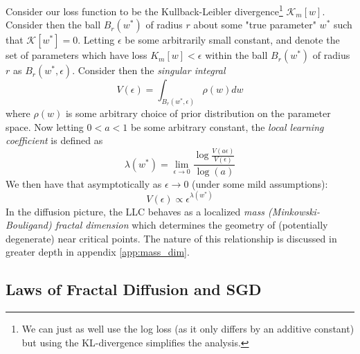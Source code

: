 \documentclass{article} %
\theoremstyle{definition}
\begin{document}
Consider our loss function to be the Kullback-Leibler divergence\footnote{We can just as well use the log loss (as it only differs by an additive constant) but using the KL-divergence simplifies the analysis.} $\mathcal{K}_m[w]$. Consider then the ball $B_r(w^*)$ of radius $r$ about some "true parameter" $w^*$ such that $\mathcal{K}[w^*] = 0$. Letting $\epsilon$ be some arbitrarily small constant, and denote the set of parameters which have loss $K_m[w] < \epsilon$ within the ball $B_r(w^*)$ of radius $r$ as $B_r(w^*, \epsilon)$. Consider then the \textit{singular integral}
\begin{equation}
    V(\epsilon) = \int_{B_r(w^*, \epsilon)} \rho(w) dw
\end{equation}
where $\rho(w)$ is some arbitrary choice of prior distribution on the parameter space. %
Now letting $0 < a < 1$ be some arbitrary constant, the \textit{local learning coefficient} \cite{lau2024locallearningcoefficientsingularityaware} is defined as
\label{glc}
\begin{equation}
    \lambda(w^*) = \lim_{\epsilon\to0} \frac{\log \frac{V(a\epsilon)}{V(\epsilon)}}{\log(a)}
\end{equation}
We then have that asymptotically as $\epsilon \to 0$ (under some mild assumptions):
\label{llc}
\begin{equation}
    V(\epsilon) \propto \epsilon^{\lambda(w^*)}
\end{equation}
In the diffusion picture, the LLC behaves as a localized \textit{mass (Minkowski-Bouligand) fractal dimension} which determines the geometry of (potentially degenerate) near critical points. The nature of this relationship is discussed in greater depth in appendix \ref{app:mass_dim}.

\subsection{Laws of Fractal Diffusion and SGD}
\end{document}
